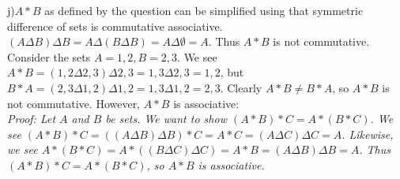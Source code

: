 \documentclass{scrartcl}
\begin{document}
j)$A*B$ as defined by the question can be simplified using that symmetric difference of sets is commutative associative. $(A\Delta B)\Delta B=A\Delta(B\Delta B)=A\Delta \emptyset=A$. Thus $A*B$ is not commutative. Consider the sets $A={1,2}, B={2,3}$. We see $A*B=({1,2}\Delta{2,3})\Delta{2,3}={1,3}\Delta{2,3}={1,2}$, but $B*A=({2,3}\Delta{1,2})\Delta{1,2}={1,3}\Delta{1,2}={2,3}$. Clearly $A*B\ne B*A$, so $A*B$ is not commutative. However, $A*B$ is associative:\\

\em Proof: \em Let $A$ and $B$ be sets. We want to show $(A*B)*C=A*(B*C)$. We see $(A*B)*C=((A\Delta B)\Delta B)*C=A*C=(A\Delta C)\Delta C=A$. Likewise, we see $A*(B*C)=A*((B\Delta C)\Delta C)=A*B=(A\Delta B)\Delta B=A$. Thus $(A*B)*C=A*(B*C)$, so $A*B$ is associative.\\
\end{document}
